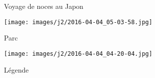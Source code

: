 \documentclass[11pt, a4paper, twoside, openright]{book}
\begin{document}
\pagestyle{empty}

\begin{titlepage}
  \begin{center}
    {\Huge Voyage de noces au Japon}
  \end{center}
\end{titlepage}
\clearpage%

\mainmatter%

\begin{minipage}[t][0.025\textheight][t]{\textwidth}
  \hfill\vfill
\end{minipage}
\begin{minipage}[t][0.45\textheight][t]{\textwidth}
  \begin{center}
    \texttt{[image: images/j2/2016-04-04\_05-03-58.jpg]}\\[1em]
  \end{center}
\end{minipage}
\begin{minipage}[t][0.03\textheight][t]{\textwidth}
  \begin{center}
    Parc\\[1em]
  \end{center}
\end{minipage}
\begin{minipage}[t][0.45\textheight][t]{\textwidth}
  \begin{center}
    \texttt{[image: images/j2/2016-04-04\_04-20-04.jpg]}\\[1em]
  \end{center}
\end{minipage}
\begin{minipage}[t][0.03\textheight][t]{\textwidth}
  \begin{center}
    Légende\\[1em]
  \end{center}
\end{minipage}

\end{document}
